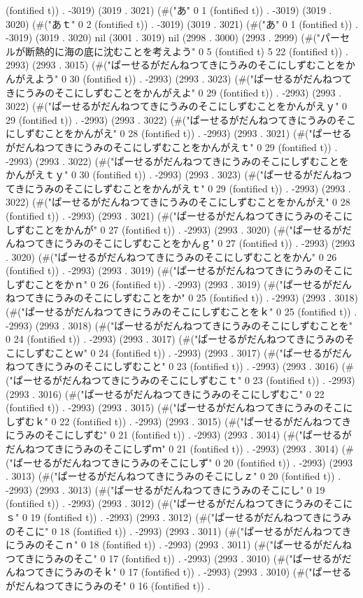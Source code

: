 (fontified t)) . -3019) (3019 . 3021) (#("あ" 0 1 (fontified t)) . -3019) (3019 . 3020) (#("あｔ" 0 2 (fontified t)) . -3019) (3019 . 3021) (#("あ" 0 1 (fontified t)) . -3019) (3019 . 3020) nil (3001 . 3019) nil (2998 . 3000) (2993 . 2999) (#("パーセルが断熱的に海の底に沈むことを考えよう" 0 5 (fontified t) 5 22 (fontified t)) . 2993) (2993 . 3015) (#("ぱーせるがだんねつてきにうみのそこにしずむことをかんがえよう" 0 30 (fontified t)) . -2993) (2993 . 3023) (#("ぱーせるがだんねつてきにうみのそこにしずむことをかんがえよ" 0 29 (fontified t)) . -2993) (2993 . 3022) (#("ぱーせるがだんねつてきにうみのそこにしずむことをかんがえｙ" 0 29 (fontified t)) . -2993) (2993 . 3022) (#("ぱーせるがだんねつてきにうみのそこにしずむことをかんがえ" 0 28 (fontified t)) . -2993) (2993 . 3021) (#("ぱーせるがだんねつてきにうみのそこにしずむことをかんがえｔ" 0 29 (fontified t)) . -2993) (2993 . 3022) (#("ぱーせるがだんねつてきにうみのそこにしずむことをかんがえｔｙ" 0 30 (fontified t)) . -2993) (2993 . 3023) (#("ぱーせるがだんねつてきにうみのそこにしずむことをかんがえｔ" 0 29 (fontified t)) . -2993) (2993 . 3022) (#("ぱーせるがだんねつてきにうみのそこにしずむことをかんがえ" 0 28 (fontified t)) . -2993) (2993 . 3021) (#("ぱーせるがだんねつてきにうみのそこにしずむことをかんが" 0 27 (fontified t)) . -2993) (2993 . 3020) (#("ぱーせるがだんねつてきにうみのそこにしずむことをかんｇ" 0 27 (fontified t)) . -2993) (2993 . 3020) (#("ぱーせるがだんねつてきにうみのそこにしずむことをかん" 0 26 (fontified t)) . -2993) (2993 . 3019) (#("ぱーせるがだんねつてきにうみのそこにしずむことをかｎ" 0 26 (fontified t)) . -2993) (2993 . 3019) (#("ぱーせるがだんねつてきにうみのそこにしずむことをか" 0 25 (fontified t)) . -2993) (2993 . 3018) (#("ぱーせるがだんねつてきにうみのそこにしずむことをｋ" 0 25 (fontified t)) . -2993) (2993 . 3018) (#("ぱーせるがだんねつてきにうみのそこにしずむことを" 0 24 (fontified t)) . -2993) (2993 . 3017) (#("ぱーせるがだんねつてきにうみのそこにしずむことｗ" 0 24 (fontified t)) . -2993) (2993 . 3017) (#("ぱーせるがだんねつてきにうみのそこにしずむこと" 0 23 (fontified t)) . -2993) (2993 . 3016) (#("ぱーせるがだんねつてきにうみのそこにしずむこｔ" 0 23 (fontified t)) . -2993) (2993 . 3016) (#("ぱーせるがだんねつてきにうみのそこにしずむこ" 0 22 (fontified t)) . -2993) (2993 . 3015) (#("ぱーせるがだんねつてきにうみのそこにしずむｋ" 0 22 (fontified t)) . -2993) (2993 . 3015) (#("ぱーせるがだんねつてきにうみのそこにしずむ" 0 21 (fontified t)) . -2993) (2993 . 3014) (#("ぱーせるがだんねつてきにうみのそこにしずｍ" 0 21 (fontified t)) . -2993) (2993 . 3014) (#("ぱーせるがだんねつてきにうみのそこにしず" 0 20 (fontified t)) . -2993) (2993 . 3013) (#("ぱーせるがだんねつてきにうみのそこにしｚ" 0 20 (fontified t)) . -2993) (2993 . 3013) (#("ぱーせるがだんねつてきにうみのそこにし" 0 19 (fontified t)) . -2993) (2993 . 3012) (#("ぱーせるがだんねつてきにうみのそこにｓ" 0 19 (fontified t)) . -2993) (2993 . 3012) (#("ぱーせるがだんねつてきにうみのそこに" 0 18 (fontified t)) . -2993) (2993 . 3011) (#("ぱーせるがだんねつてきにうみのそこｎ" 0 18 (fontified t)) . -2993) (2993 . 3011) (#("ぱーせるがだんねつてきにうみのそこ" 0 17 (fontified t)) . -2993) (2993 . 3010) (#("ぱーせるがだんねつてきにうみのそｋ" 0 17 (fontified t)) . -2993) (2993 . 3010) (#("ぱーせるがだんねつてきにうみのそ" 0 16 (fontified t)) . 